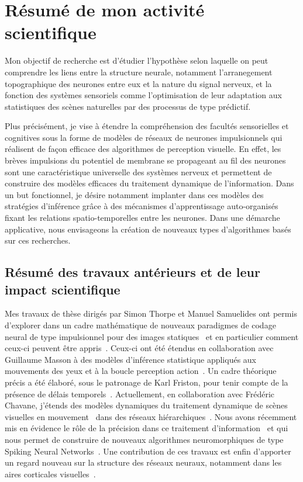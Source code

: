 \documentclass[10pt,french,a4paper,oneside]{article}%
\begin{document}
\newpage
\section{Résumé de mon activité scientifique}

Mon objectif de recherche est d'étudier l'hypothèse selon laquelle on peut comprendre les liens entre la structure neurale, notamment l'arranegement topographique des neurones entre eux et la nature du signal nerveux, et la fonction des systèmes sensoriels comme l'optimisation de leur adaptation aux statistiques des scènes naturelles par des processus de type prédictif.

Plus précisément, je vise à étendre la compréhension des facultés sensorielles et cognitives sous la forme de modèles de réseaux de neurones impulsionnels qui réalisent de façon efficace des algorithmes de  perception visuelle. En effet, les brèves impulsions du potentiel de membrane se propageant au fil des neurones sont une caractéristique universelle des systèmes nerveux et permettent de construire des modèles efficaces du traitement dynamique de l'information. Dans un but fonctionnel, je désire notamment implanter dans ces modèles des stratégies d'inférence grâce à des mécanismes d'apprentissage auto-organisés fixant les relations spatio-temporelles entre les neurones. Dans une démarche applicative, nous envisageons la création de nouveaux types d'algorithmes basés sur ces recherches.

\subsection*{Résumé des travaux antérieurs et de leur impact scientifique}
Mes travaux de thèse dirigés par Simon Thorpe et Manuel Samuelides ont permis d'explorer dans un cadre mathématique de nouveaux paradigmes de codage neural de type impulsionnel pour des images statiques~\citep{Perrinet03ieee} et en particulier comment ceux-ci peuvent être appris~\citep{Perrinet10shl}. Ceux-ci ont été étendus en collaboration avec Guillaume Masson à des modèles d'inférence statistique appliqués aux mouvements des yeux et à la boucle perception action~\citep{Simoncini12}. Un cadre théorique précis a été élaboré, sous le patronage de Karl Friston, pour tenir compte de la présence de délais temporels~\citep{PerrinetAdamsFriston14}. Actuellement, en collaboration avec Frédéric Chavane, j'étends des modèles dynamiques du traitement dynamique de scènes visuelles en mouvement~\citep{KhoeiMassonPerrinet17} dans des réseaux hiérarchiques~\citep{BoutinFranciosiniChavaneRuffierPerrinet20,Franciosini21}. Nous avons récemment mis en évidence le rôle de la précision dans ce traitement d'information~\citep{Ladret22} et qui nous permet de construire de nouveaux algorithmes neuromorphiques de type Spiking Neural Networks~\citep{Grimaldi22pami}. Une contribution de ces travaux est enfin d'apporter un regard nouveau sur la structure des réseaux neuraux, notamment dans les aires corticales visuelles~\citep{Chavane22}.
\end{document}
